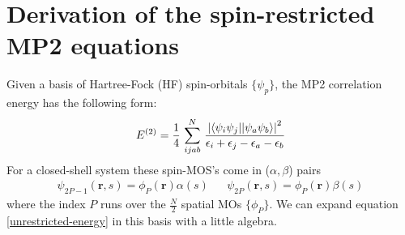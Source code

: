 \documentclass[11pt]{article}
\renewcommand{\a}{\alpha}   %
\renewcommand{\b}{\beta}     %
\newcommand{\e}{\epsilon}  %
\newcommand{\f}{\phi}        %
\newcommand{\y}{\ensuremath{\psi}}
\newcommand{\bo}[1]{\ensuremath{\mathbf{#1}}}
\theoremstyle{mystyle}
\numberwithin{equation}{section}
\begin{document}
\section{Derivation of the spin-restricted MP2 equations}
Given a basis of Hartree-Fock (HF) spin-orbitals $\{ \y_p \}$, the MP2 correlation energy has the following form:
\begin{equation} 
\label{unrestricted-energy}
   E^{(2)}
=
   \frac{1}{4} \,
   \sum\limits_{ijab}^N \,
   \frac{
       \left|
       \braket{ \y_i \y_j || \y_a \y_b }
       \right|^2
   }
   {
      \e_i + \e_j - \e_a - \e_b
   }
\end{equation}
For a closed-shell system these spin-MOS's come in ($\a,\b$) pairs 
\begin{align*}
   \y_{2P-1}
   (\bo{r},s)
=
   \f_P (\bo{r})
   \a (s)
&&
    \y_{2P}
   (\bo{r},s)
=
   \f_P (\bo{r})
   \b (s)
\end{align*}
where the index $P$ runs over the $\tfrac{N}{2}$ spatial MOs $\{\f_P \}$. We can expand equation \ref{unrestricted-energy} in this basis with a little algebra.
\end{document}
